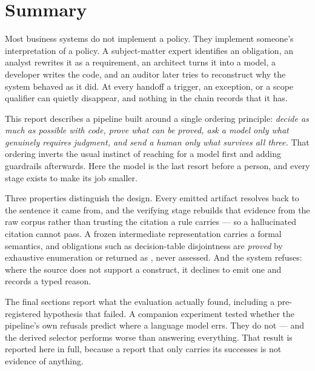 \documentclass[11pt]{article}
\begin{document}
\section*{\plexsans Summary}
\vspace{-0.4em}
\noindent{\color{forge}\rule{\linewidth}{1.2pt}}
\vspace{0.8em}

\noindent
Most business systems do not implement a policy. They implement someone's
interpretation of a policy. A subject-matter expert identifies an
obligation, an analyst rewrites it as a requirement, an architect turns it
into a model, a developer writes the code, and an auditor later tries to
reconstruct why the system behaved as it did. At every handoff a trigger,
an exception, or a scope qualifier can quietly disappear, and nothing in
the chain records that it has.

This report describes a pipeline built around a single ordering principle:
\emph{decide as much as possible with code, prove what can be proved, ask a
model only what genuinely requires judgment, and send a human only what
survives all three.} That ordering inverts the usual instinct of reaching
for a model first and adding guardrails afterwards. Here the model is the
last resort before a person, and every stage exists to make its job
smaller.

Three properties distinguish the design. Every emitted artifact resolves
back to the sentence it came from, and the verifying stage rebuilds that
evidence from the raw corpus rather than trusting the citation a rule
carries --- so a hallucinated citation cannot pass. A frozen intermediate
representation carries a formal semantics, and obligations such as
decision-table disjointness are \emph{proved} by exhaustive enumeration or
returned as , never assessed. And the system refuses: where
the source does not support a construct, it declines to emit one and
records a typed reason.

The final sections report what the evaluation actually found, including a
pre-registered hypothesis that failed. A companion experiment tested
whether the pipeline's own refusals predict where a language model errs.
They do not --- and the derived selector performs worse than answering
everything. That result is reported here in full, because a report that
only carries its successes is not evidence of anything.
\end{document}
